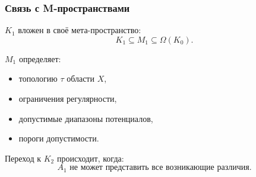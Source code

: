 \subsubsection{Связь с M-пространствами}

$K_1$ вложен в своё мета-пространство:
\[
K_1 \subseteq M_1 \subseteq \Omega(K_0).
\]

$M_1$ определяет:
\begin{itemize}
    \item топологию $\tau$ области $X$,
    \item ограничения регулярности,
    \item допустимые диапазоны потенциалов,
    \item пороги допустимости.
\end{itemize}

Переход к $K_2$ происходит, когда:
\[
A_1 \text{ не может представить все возникающие различия.}
\]
